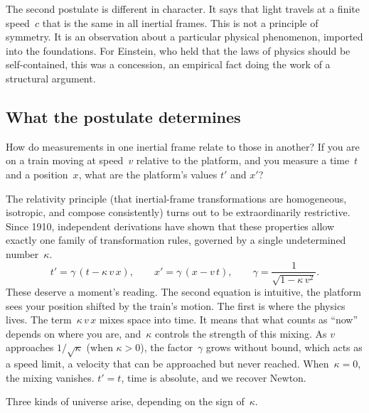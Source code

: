 \documentclass[11pt]{article}
\begin{document}
The second postulate is different in character. It says that light travels at a finite speed~$c$ that is the same in all inertial frames. This is not a principle of symmetry. It is an observation about a particular physical phenomenon, imported into the foundations. For Einstein, who held that the laws of physics should be self-contained, this was a concession, an empirical fact doing the work of a structural argument.


\subsection*{What the postulate determines}

How do measurements in one inertial frame relate to those in another? If you are on a train moving at speed~$v$ relative to the platform, and you measure a time~$t$ and a position~$x$, what are the platform's values $t'$ and $x'$?

The relativity principle (that inertial-frame transformations are homogeneous, isotropic, and compose consistently) turns out to be extraordinarily restrictive. Since 1910, independent derivations \cite{Ignatowski1910,BerziGorini1969,LevyLeblond1976,BacryLL1968} have shown that these properties allow exactly one family of transformation rules, governed by a single undetermined number~$\kappa$.
\[
t' = \gamma\,(t - \kappa\, v\, x), \qquad x' = \gamma\,(x - v\, t), \qquad \gamma = \frac{1}{\sqrt{1-\kappa\, v^2}}.
\]
These deserve a moment's reading. The second equation is intuitive, the platform sees your position shifted by the train's motion. The first is where the physics lives. The term~$\kappa\, v\, x$ mixes space into time. It means that what counts as ``now'' depends on where you are, and~$\kappa$ controls the strength of this mixing. As $v$ approaches $1/\sqrt{\kappa}$ (when $\kappa > 0$), the factor~$\gamma$ grows without bound, which acts as a speed limit, a velocity that can be approached but never reached. When~$\kappa = 0$, the mixing vanishes. $t' = t$, time is absolute, and we recover Newton.

Three kinds of universe arise, depending on the sign of~$\kappa$.
\end{document}

